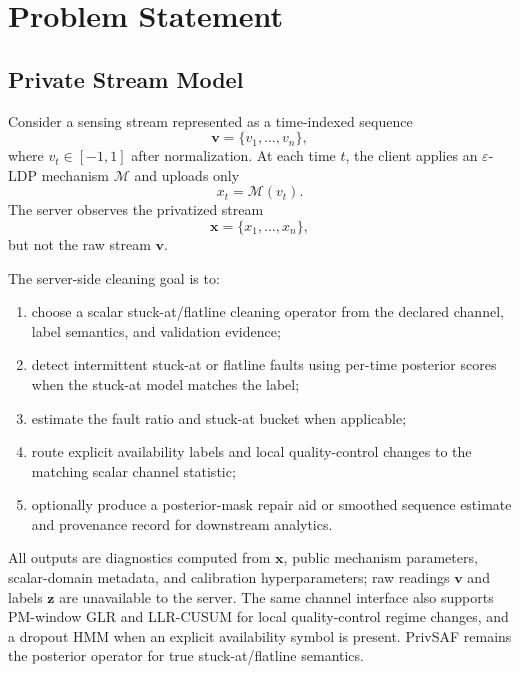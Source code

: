 \documentclass[conference]{IEEEtran}
\begin{document}
\section{Problem Statement}
\label{sec:problem}

\subsection{Private Stream Model}
Consider a sensing stream represented as a time-indexed sequence
\[
\mathbf{v}=\{v_1,\ldots,v_n\},
\]
where \(v_t\in[-1,1]\) after normalization. At each time \(t\), the client applies an \(\varepsilon\)-LDP mechanism \(\mathcal{M}\) and uploads only
\[
x_t=\mathcal{M}(v_t).
\]
The server observes the privatized stream
\[
\mathbf{x}=\{x_1,\ldots,x_n\},
\]
but not the raw stream \(\mathbf{v}\).

The server-side cleaning goal is to:
\begin{enumerate}
    \item choose a scalar stuck-at/flatline cleaning operator from the declared channel, label semantics, and validation evidence;
    \item detect intermittent stuck-at or flatline faults using per-time posterior scores when the stuck-at model matches the label;
    \item estimate the fault ratio and stuck-at bucket when applicable;
    \item route explicit availability labels and local quality-control changes to the matching scalar channel statistic;
    \item optionally produce a posterior-mask repair aid or smoothed sequence estimate and provenance record for downstream analytics.
\end{enumerate}

All outputs are diagnostics computed from \(\mathbf{x}\), public mechanism parameters, scalar-domain metadata, and calibration hyperparameters; raw readings \(\mathbf{v}\) and labels \(\mathbf{z}\) are unavailable to the server. The same channel interface also supports PM-window GLR and LLR-CUSUM for local quality-control regime changes, and a dropout HMM when an explicit availability symbol is present. PrivSAF remains the posterior operator for true stuck-at/flatline semantics.
\end{document}
